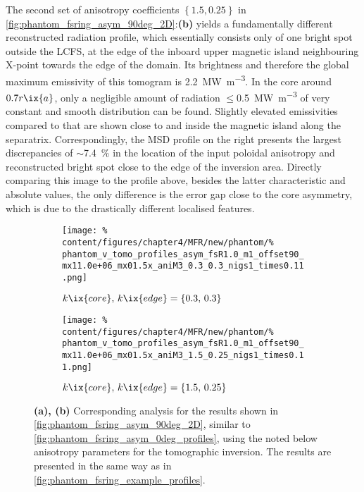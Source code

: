                The second set of anisotropy coefficients $\left\{1.5, 0.25\right\}$ in \cref{fig:phantom_fsring_asym_90deg_2D}:\textbf{(b)} yields a fundamentally different reconstructed radiation profile, which essentially consists only of one bright spot outside the LCFS, at the edge of the inboard upper magnetic island neighbouring X-point towards the edge of the domain. Its brightness and therefore the global maximum emissivity of this tomogram is \SI{2.2}{\mega\watt\per\cubic\meter}. In the core around $0.7r\ix{a}$, only a negligible amount of radiation $\le$\SI{0.5}{\mega\watt\per\cubic\meter} of very constant and smooth distribution can be found. Slightly elevated emissivities compared to that are shown close to and inside the magnetic island along the separatrix. Correspondingly, the MSD profile on the right presents the largest discrepancies of $\sim$\SI{7.4}{\percent} in the location of the input poloidal anisotropy and reconstructed bright spot close to the edge of the inversion area. Directly comparing this image to the profile above, besides the latter characteristic and absolute values, the only difference is the error gap close to the core asymmetry, which is due to the drastically different localised features.\\%
%
                \begin{figure}[t]%
                    \centering%
                    \begin{subfigure}{\textwidth}%
                        \centering%
                        \texttt{[image: \%
                            content/figures/chapter4/MFR/new/phantom/\%
                            phantom\_v\_tomo\_profiles\_asym\_fsR1.0\_m1\_offset90\_mx11.0e+06\_mx01.5x\_aniM3\_0.3\_0.3\_nigs1\_times0.11.png]}%
                        \caption{$k\ix{core},\,k\ix{edge}=\left\{0.3,\,0.3\right\}$}%
                    \end{subfigure}%
                    \newline%
                    \begin{subfigure}{\textwidth}%
                        \centering%
                        \texttt{[image: \%
                            content/figures/chapter4/MFR/new/phantom/\%
                            phantom\_v\_tomo\_profiles\_asym\_fsR1.0\_m1\_offset90\_mx11.0e+06\_mx01.5x\_aniM3\_1.5\_0.25\_nigs1\_times0.11.png]}%
                        \caption{$k\ix{core},\,k\ix{edge}=\left\{1.5,\,0.25\right\}$}%
                    \end{subfigure}%
                    \caption{\textbf{(a), (b)} Corresponding analysis for the results shown in \cref{fig:phantom_fsring_asym_90deg_2D}, similar to \cref{fig:phantom_fsring_asym_0deg_profiles}, using the noted below anisotropy parameters for the tomographic inversion. The results are presented in the same way as in \cref{fig:phantom_fsring_example_profiles}.}\label{fig:phantom_fsring_asym_90deg_profiles}%
                \end{figure}%
